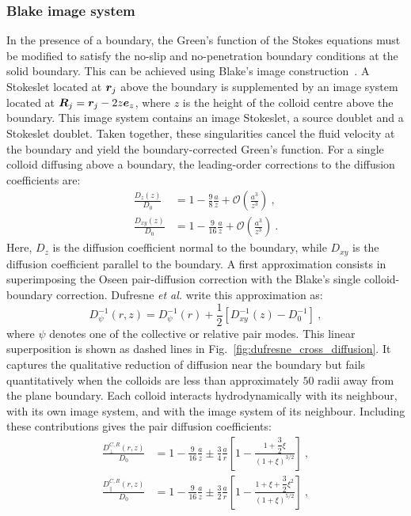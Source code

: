 \subsubsection{Blake image system}
In the presence of a boundary, the Green's function of the Stokes equations must be modified to satisfy the no-slip and no-penetration boundary conditions at the solid boundary. This can be achieved using Blake's image construction~\cite{Blake_1971}. A Stokeslet located at $\bm{r}_j$ above the boundary is supplemented by an image system located at $\bm{R}_j=\bm{r}_j - 2z\bm{e}_z$, where $z$ is the height of the colloid centre above the boundary. This image system contains an image Stokeslet, a source doublet and a Stokeslet doublet. Taken together, these singularities cancel the fluid velocity at the boundary and yield the boundary-corrected Green's function. For a single colloid diffusing above a boundary, the leading-order corrections to the diffusion coefficients are:
\begin{align}
    \frac{D_z(z)}{D_0}&=1-\frac{9}{8}\frac{a}{z}+\mathcal{O}\left(\frac{a^3}{z^3}\right)~,\\
    \frac{D_{xy}(z)}{D_0}&=1-\frac{9}{16}\frac{a}{z}+\mathcal{O}\left(\frac{a^3}{z^3}\right)~.
    \label{eq:single_particle_boundary_diffusion}
\end{align}
Here, $D_z$ is the diffusion coefficient normal to the boundary, while $D_{xy}$ is the diffusion coefficient parallel to the boundary. A first approximation consists in superimposing the Oseen pair-diffusion correction with the Blake's single colloid-boundary correction. Dufresne \emph{et al.} write this approximation as:
\begin{equation}
    D_\psi^{-1}(r,z)=D_\psi^{-1}(r)+\frac{1}{2}\left[D_{xy}^{-1}(z)-D_0^{-1}\right]~,
    \label{eq:dufresne_linear_superposition}
\end{equation}
where $\psi$ denotes one of the collective or relative pair modes. This linear superposition is shown as dashed lines in Fig.~\ref{fig:dufresne_cross_diffusion}. It captures the qualitative reduction of diffusion near the boundary but fails quantitatively when the colloids are less than approximately $50$ radii away from the plane boundary. Each colloid interacts hydrodynamically with its neighbour, with its own image system, and with the image system of its neighbour. Including these contributions gives the pair diffusion coefficients:
\begin{align}
\frac{D^{C,R}_\perp(r,z)}{D_0}&=1-\frac{9}{16}\frac{a}{z}\pm\frac{3}{4}\frac{a}{r}\left[1-\frac{1+\dfrac{3}{2}\xi}{(1+\xi)^{3/2}}\right]~,\\
\frac{D^{C,R}_\parallel(r,z)}{D_0}&=1-\frac{9}{16}\frac{a}{z}\pm\frac{3}{2}\frac{a}{r}\left[1-\frac{1+\xi+\dfrac{3}{2}\xi^2}{(1+\xi)^{5/2}}
\right]~,
\label{eq:cross_diffusion_modes_dufresne}
\end{align}
